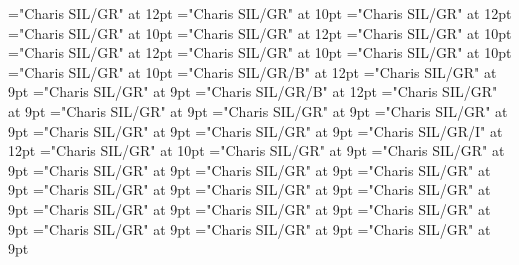 \documentclass[gps1,twoside]{article}
\begin{document}
\pagestyle{plain}
\sloppy
\setlength{\parfillskip}{0pt plus 1fil}
\font\diven="Charis SIL/GR" at 12pt
\font\spanen="Charis SIL/GR" at 10pt
\font\divtpi="Charis SIL/GR" at 12pt
\font\spantpi="Charis SIL/GR" at 10pt
\font\divbzh="Charis SIL/GR" at 12pt
\font\spanbzh="Charis SIL/GR" at 10pt
\font\divbzhfonipa="Charis SIL/GR" at 12pt
\font\spanbzhfonipa="Charis SIL/GR" at 10pt
\font\spanfr="Charis SIL/GR" at 10pt
\font\spanes="Charis SIL/GR" at 10pt
\font\spanbzhmainheadwordentry="Charis SIL/GR/B" at 12pt
\font\spanspanmainheadwordentrybefore="Charis SIL/GR" at 9pt
\font\spanmainheadwordentrylastchildafter="Charis SIL/GR" at 9pt
\font\spanmainheadwordentry="Charis SIL/GR/B" at 12pt
\font\pronunciationpronunciationpronunciationsentrybefore="Charis SIL/GR" at 9pt
\font\pronunciationsentryafter="Charis SIL/GR" at 9pt
\font\spanspanformpronunciationpronunciationsentrybefore="Charis SIL/GR" at 9pt
\font\spanformpronunciationpronunciationsentryfirstchildbefore="Charis SIL/GR" at 9pt
\font\spanformpronunciationpronunciationsentrylastchildafter="Charis SIL/GR" at 9pt
\font\locationpronunciationpronunciationsentryafter="Charis SIL/GR" at 9pt
\font\locationpronunciationpronunciationsentry="Charis SIL/GR/I" at 12pt
\font\spanwritingsystemprefixspanabbreviationlocationpronunciationpronunciationsentry="Charis SIL/GR" at 10pt
\font\spanwritingsystemprefixspanabbreviationlocationpronunciationpronunciationsentryafter="Charis SIL/GR" at 9pt
\font\spanspanabbreviationlocationpronunciationpronunciationsentrybefore="Charis SIL/GR" at 9pt
\font\spanabbreviationlocationpronunciationpronunciationsentrylastchildafter="Charis SIL/GR" at 9pt
\font\spanspannamelocationpronunciationpronunciationsentrybefore="Charis SIL/GR" at 9pt
\font\spannamelocationpronunciationpronunciationsentrylastchildafter="Charis SIL/GR" at 9pt
\font\spanspanaliaslocationpronunciationpronunciationsentrybefore="Charis SIL/GR" at 9pt
\font\spanaliaslocationpronunciationpronunciationsentrylastchildafter="Charis SIL/GR" at 9pt
\font\spanspanvariantformentrybackrefsentrybefore="Charis SIL/GR" at 9pt
\font\variantformentrybackrefsentrybefore="Charis SIL/GR" at 9pt
\font\variantformentrybackrefsentryafter="Charis SIL/GR" at 9pt
\font\variantentrytypevariantentrytypevariantentrytypesvariantformentrybackrefvariantformentrybackrefsentrybefore="Charis SIL/GR" at 9pt
\font\variantentrytypesvariantformentrybackrefvariantformentrybackrefsentryafter="Charis SIL/GR" at 9pt
\font\spanspanreverseabbrvariantentrytypevariantentrytypesvariantformentrybackrefvariantformentrybackrefsentrybefore="Charis SIL/GR" at 9pt
\font\spanreverseabbrvariantentrytypevariantentrytypesvariantformentrybackrefvariantformentrybackrefsentrylastchildafter="Charis SIL/GR" at 9pt
\end{document}
